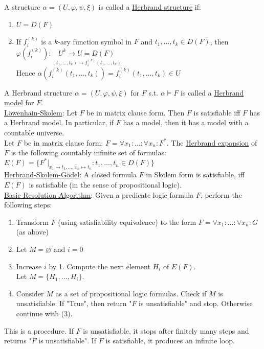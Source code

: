 \documentclass[a4paper]{article}
\newcommand{\ul}{\underline}
\let\phi\varphi
\begin{document}
A structure $\alpha=(U,\phi,\psi,\xi)$ is called a \ul{Herbrand structure} if:
\begin{enumerate}[(1)]
	\item $U=D(F)$
	\item If $f_i^{(k)}$ is a $k$-ary function symbol in $F$ and $t_1,\dots,t_k\in D(F)$, then $\phi(f_i^{(k)}):\underset{(t_1,\dots,t_k)\mapsto f_i^{(k)}(t_1,\dots,t_k)}{U^k\rightarrow U=D(F)}$\\
	Hence $\alpha(f_i^{(k)}(t_1,\dots,t_k))=f_i^{(k)}(t_1,\dots,t_k)\in U$
\end{enumerate}
A Herbrand structure $\alpha=(U,\phi,\psi,\xi)$ for $F$ s.t. $\alpha\models F$ is called a \ul{Herbrand model} for $F$.\\
\ul{Löwenhain-Skolem}: Let $F$ be in matrix clause form. Then $F$ is satisfiable iff $F$ has a Herbrand model. In particular, if $F$ has a model, then it has a model with a countable universe.\\
Let $F$ be in matrix clause form: $F=\forall x_1:\dots:\forall x_n:F^*$. The \ul{Herbrand expansion} of $F$ is the following countably infinite set of formulas: $E(F)=\{F^*\vert_{x_1\mapsto t_1,\dots,x_n\mapsto t_n}:t_1,\dots,t_n\in D(F)\}$\\
\ul{Herbrand-Skolem-Gödel}: A closed formula $F$ in Skolem form is satisfiable, iff $E(F)$ is satisfiable (in the sense of propositional logic).\\
\ul{Basic Resolution Algorithm}: Given a predicate logic formula $F$, perform the following steps:
\begin{enumerate}[(1)]
	\item Transform $F$ (using satisfiability equivalence) to the form $F=\forall x_1:\dots:\forall x_n:G$ (as above)
	\item Let $M=\varnothing$ and $i=0$
	\item Increase $i$ by 1. Compute the next element $H_i$ of $E(F)$.\\
	Let $M=\{H_1,\dots,H_i\}$.
	\item Consider $M$ as a set of propositional logic formulas. Check if $M$ is unsatisfiable. If "True", then return "$F$ is unsatisfiable" and stop. Otherwise continue with (3).
\end{enumerate}
This is a procedure. If $F$ is unsatisfiable, it stops after finitely many steps and returns "$F$ is unsatisfiable". If $F$ is satisfiable, it produces an infinite loop.\\
\end{document}
